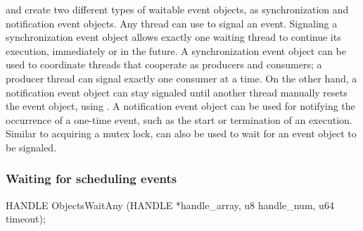 and  create two different types of waitable event objects, as synchronization and notification event objects.
Any thread can use  to signal an event.
Signaling a synchronization event object allows exactly one waiting thread to continue its execution,
immediately or in the future.
A synchronization event object can be used to coordinate threads that cooperate as producers and consumers;
a producer thread can signal exactly one consumer at a time.
On the other hand, a notification event object can stay signaled until another thread
manually resets the event object, using .
A notification event object can be used for notifying the occurrence of a one-time event,
such as the start or termination of an execution.
Similar to acquiring a mutex lock,
 can also be used
to wait for an event object to be signaled.




\subsubsection*{Waiting for scheduling events}





\begin{paldef}
HANDLE ObjectsWaitAny (HANDLE *handle_array,
                       u8 handle_num, u64 timeout);
\end{paldef}


